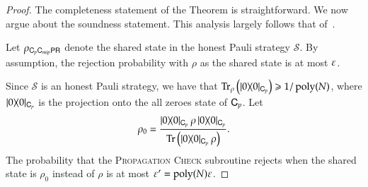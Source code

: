 \begin{proof}
	The completeness statement of the Theorem is straightforward. We now argue about the soundness statement. This analysis largely follows that of~\cite{ji2016compression}. 
	
	Let $\rho_{{\mathsf{C}}_p {\mathsf{C}}_{mip} {\mathsf{P}} {\mathsf{R}}}$ denote the shared state in the honest Pauli strategy $\mathcal{S}$. By assumption, the rejection probability with $\rho$ as the shared state is at most $\varepsilon$. %
	
	Since $\mathcal{S}$ is an honest Pauli strategy, we have that $\operatorname{Tr}_\rho \left ( |0\rangle\! \langle 0|_{{\mathsf{C}}_p}  \right) \geqslant 1/\operatorname{poly}(N)$, where $|0\rangle\! \langle 0|_{{\mathsf{C}}_p}$ is the projection onto the all zeroes state of ${\mathsf{C}}_p$. Let 
	\[
		\rho_0 = \frac{|0\rangle\! \langle 0|_{{\mathsf{C}}_p} \, \rho \, |0\rangle\! \langle 0|_{{\mathsf{C}}_p}}{\operatorname{Tr} \left ( |0\rangle\! \langle 0|_{{\mathsf{C}}_p} \, \rho \right)}.
	\]
	The probability that the \textsc{Propagation Check} subroutine rejects when the shared state is $\rho_0$ instead of $\rho$ is at most $\varepsilon' = \operatorname{poly}(N) \varepsilon$. 
	

\end{proof}
